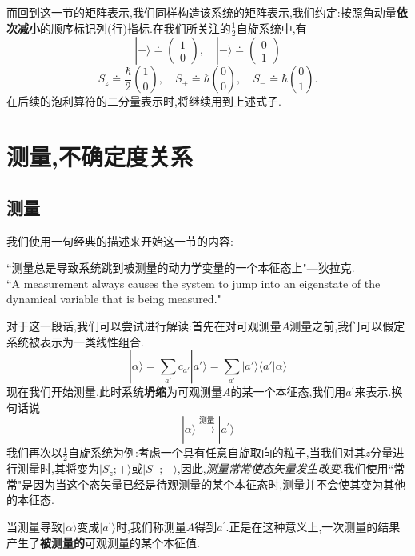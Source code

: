 而回到这一节的矩阵表示,我们同样构造该系统的矩阵表示,我们约定:按照角动量\textbf{依次减小}的顺序标记列(行)指标.在我们所关注的$\frac12$自旋系统中,有
\begin{equation}
	|+\rangle\doteq\begin{pmatrix}1\\0\end{pmatrix},\quad|-\rangle\doteq\begin{pmatrix}0\\1\end{pmatrix}
\end{equation}
\begin{equation}
	S_z\doteq\frac{\hbar}{2}\binom{1}{0},\quad S_+\doteq\hbar\binom{0}{0},\quad S_-\doteq\hbar\binom{0}{1}.
\end{equation}
在后续的泡利算符的二分量表示时,将继续用到上述式子.
\section{测量,不确定度关系}
\subsection{测量}
我们使用一句经典的描述来开始这一节的内容:
\begin{note}
	``测量总是导致系统跳到被测量的动力学变量的一个本征态上"---狄拉克.\\
	``A measurement always causes the system to jump into an eigenstate of the dynamical variable that is being measured."
\end{note}
对于这一段话,我们可以尝试进行解读:首先在对可观测量$A$测量之前,我们可以假定系统被表示为一类线性组合.
\begin{equation}
	|\alpha\rangle = \sum_{a'}c_{a'} | a' \rangle = \sum_{a'} | a' \rangle \langle a' | \alpha\rangle 
\end{equation}
现在我们开始测量,此时系统\textbf{坍缩}为可观测量$A$的某一个本征态,我们用$a^{'}$来表示.换句话说
\begin{equation}\label{eq1.3.1}
	|\alpha\rangle\xrightarrow{\text{测量}}| a^{\prime}\rangle 
\end{equation}
我们再次以$\frac12$自旋系统为例:考虑一个具有任意自旋取向的粒子,当我们对其$z$分量进行测量时,其将变为$|S_z;+\rangle$或$|S_-;-\rangle$,因此,\textit{测量常常使态矢量发生改变}.我们使用``常常"是因为当这个态矢量已经是待观测量的某个本征态时,测量并不会使其变为其他的本征态.

当测量导致$|\alpha\rangle$变成$|a^{\prime}\rangle$时,我们称测量$A$得到$a^{\prime}$.正是在这种意义上,一次测量的结果产生了\textbf{被测量的}可观测量的某个本征值.

